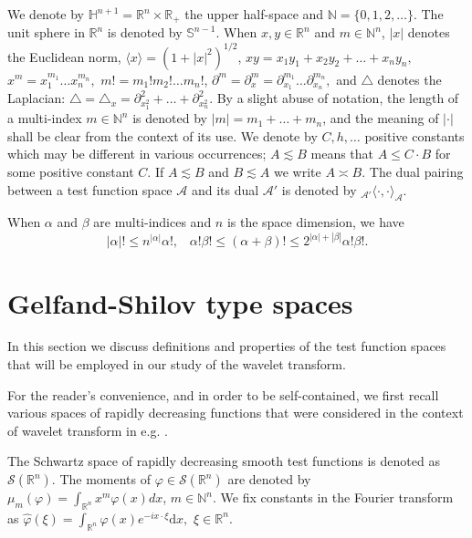 \documentclass[reqno,12pt]{amsart}
\theoremstyle{plain}
\theoremstyle{definition}
\theoremstyle{remark}
\begin{document}
We denote by $\mathbb{H}^{n + 1} = \mathbb{R}^n \times \mathbb{R}_+ $ the upper half-space
and $\mathbb{N} = \{ 0,1,2, \dots \}$. The unit sphere in $ \mathbb{R}^n$ is denoted by $\mathbb{S}^{n-1}$.
When $ x, y \in \mathbb{R}^n $ and $ m \in
\mathbb{N}^n $, $|x|$ denotes the Euclidean norm, $ \langle x \rangle = (1+|x|^2)^{1/2}$,
$ xy = x_1 y_1 + x_2 y_2 + \dots + x_n y_n, $ $ x^{m} = x_1^{m_1} \dots x_n^{m_n},$
$m! = m_1! m_2! \dots m_n! $,
$\partial^{m}=\partial_x^{m} =
\partial_{x_1}^{m_1} \dots\partial_{x_n}^{m_n},$ and $ \triangle $ denotes the Laplacian: $
\triangle = \triangle_x = \partial_{x_1 ^2 }^{2} + \dots + \partial_{x_n ^2}^{2}.$
By a slight abuse of notation, the length of a multi-index
$ m \in \mathbb{N}^n $ is denoted by $ |m| = m_1 + \dots + m_n $, and
the meaning of $|\cdot| $ shall be clear from the context of its use.
We denote by $C,  h, \dots$  positive constants which may be different in various occurrences;
$ A\lesssim B $ means that $ A \leq C \cdot B $ for
some positive constant $C$.
If $ A\lesssim B $  and  $ B\lesssim A $ we write $ A \asymp B $.
The dual pairing between a test function space $ {\mathcal A}$ and its dual ${\mathcal A'}$ is denoted by
$ _{\mathcal A'}\langle \cdot, \cdot \rangle_{\mathcal A} $.

When $ \alpha$ and $ \beta $ are multi-indices and $n$ is the space dimension,
we have
$$
|\alpha|! \leq n^{|\alpha|}\alpha !, \;\;\;
 \alpha! \beta! \leq  (\alpha +\beta)! \leq 2^{|\alpha|+|\beta|} \alpha ! \beta!.
$$

\par

\section{Gelfand-Shilov type spaces}  \label{Sec1}

In this section we discuss definitions and properties of the test function spaces
that will
be employed in our study of the wavelet transform.

\par

For the reader's convenience, and in order to be self-contained,
we first recall various spaces of rapidly decreasing functions that were considered in the context of wavelet transform
in e.g. \cite{hol1, PRV}.

\par

The Schwartz space of rapidly decreasing smooth test functions
is denoted as $\mathcal{S} (\mathbb{R}^{n})$. The moments of
$\varphi\in\mathcal{S}(\mathbb{R}^{n})$ are denoted by
$\mu_{m}(\varphi)=\int_{\mathbb{R}^{n}} x^{m}\varphi(x)dx$,
$m\in\mathbb{N}^{n}$. We fix constants in the Fourier
transform as $\hat{\varphi}(\xi) = \int_{\mathbb{R}^{n}}
\varphi(x) e^{-ix \cdot \xi} \mathrm{d}x,$ $\xi\in\mathbb{R}^{n}$.
\end{document}
